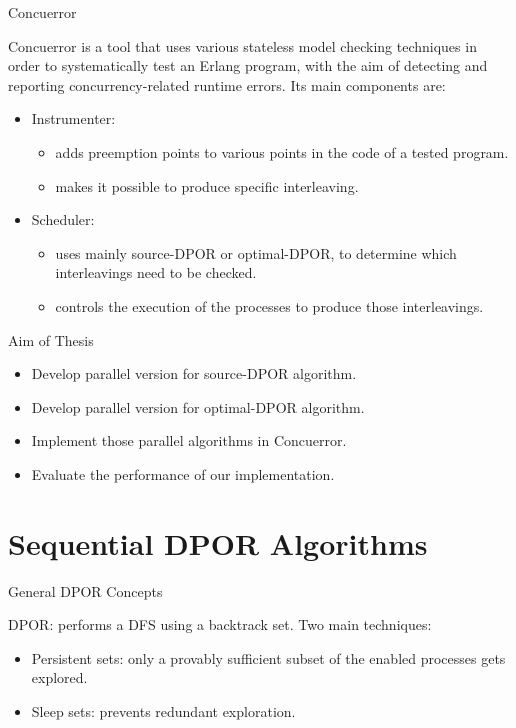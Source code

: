 \documentclass[9pt]{beamer}
\begin{document}
\begin{frame} {Concuerror}

Concuerror is a tool that uses various stateless model checking techniques
in order to systematically 
test an Erlang program, with the aim of detecting and reporting concurrency-related runtime errors.
Its main components are:

\begin{itemize}[<+->]
\item Instrumenter:
  \begin{itemize}
  \item adds preemption points to various points in the code of a tested program.
  \item makes it possible to produce specific interleaving.
  \end{itemize}

\item Scheduler:
  \begin{itemize}
  \item uses mainly source-DPOR or optimal-DPOR, to determine which interleavings need to be checked.
  \item controls the execution of the processes to produce those interleavings.
  \end{itemize}
\end{itemize}

 
\end{frame}

\begin{frame}{Aim of Thesis}

\begin{itemize}[<+->]
    \item Develop parallel version for source-DPOR algorithm.
    \item Develop parallel version for optimal-DPOR algorithm.
    \item Implement those parallel algorithms in Concuerror.
    \item Evaluate the performance of our implementation.
\end{itemize}

\end{frame}

\section{Sequential DPOR Algorithms}


\begin{frame} {General DPOR Concepts}

DPOR: performs a DFS using a backtrack set. Two main techniques:
\begin{itemize}[<+->]
    \item Persistent sets: only a provably sufficient subset of the enabled processes gets explored.
    \item Sleep sets: prevents redundant exploration.
\end{itemize}

\end{frame}
\end{document}
